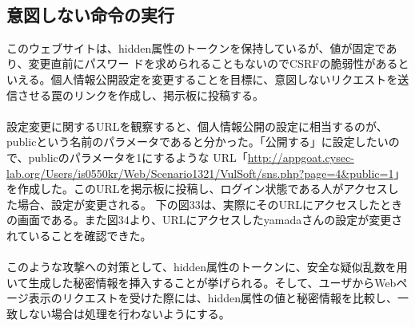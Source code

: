 \documentclass[dvipdfmx,autodetect-engine,titlepage]{jsarticle}
\begin{document}
　
\subsection{意図しない命令の実行}
このウェブサイトは、hidden属性のトークンを保持しているが、値が固定であり、変更直前にパスワー
ドを求められることもないのでCSRFの脆弱性があるといえる。個人情報公開設定を変更することを目標に、意図しないリクエストを送信させる罠のリンクを作成し、掲示板に投稿する。\\\\
設定変更に関するURLを観察すると、個人情報公開の設定に相当するのが、publicという名前のパラメータであると分かった。「公開する」に設定したいので、publicのパラメータを1にするような
URL「\url{http://appgoat.cysec-lab.org/Users/is0550kr/Web/Scenario1321/VulSoft/sns.php?page=4&public=1}」を作成した。このURLを掲示板に投稿し、ログイン状態である人がアクセスした場合、設定が変更される。
下の図33は、実際にそのURLにアクセスしたときの画面である。また図34より、URLにアクセスしたyamadaさんの設定が変更されていることを確認できた。\\\\
このような攻撃への対策として、hidden属性のトークンに、安全な疑似乱数を用いて生成した秘密情報を挿入することが挙げられる。そして、ユーザからWebページ表示のリクエストを受けた際には、hidden属性の値と秘密情報を比較し、一致しない場合は処理を行わないようにする。
\end{document}

